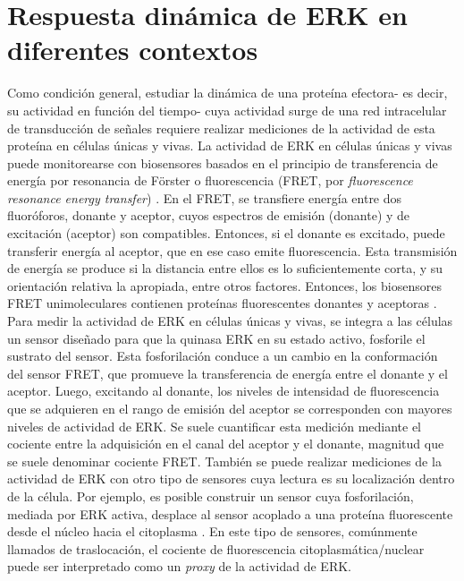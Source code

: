 \documentclass[./main.tex]{subfiles}
\begin{document}
\section{Respuesta dinámica de ERK en diferentes contextos}
\label{C1_sec:ERK}

Como condición general, estudiar la dinámica de una proteína efectora- es decir, su actividad en función del tiempo- cuya actividad surge de una red intracelular de transducción de señales requiere realizar mediciones de la actividad de esta proteína en células únicas y vivas. La actividad de ERK en células únicas y vivas puede monitorearse con biosensores basados en el principio de transferencia de energía por resonancia de Förster o fluorescencia (FRET, por \textit{fluorescence resonance energy transfer}) \cite{Komatsu2011}. En el FRET, se transfiere energía entre dos fluoróforos, donante y aceptor, cuyos espectros de emisión (donante) y de excitación (aceptor) son compatibles. Entonces, si el donante es excitado, puede transferir energía al aceptor, que en ese caso emite fluorescencia. Esta transmisión de energía se produce si la distancia entre ellos es lo suficientemente corta, y su orientación relativa la apropiada, entre otros factores. Entonces, los biosensores FRET unimoleculares contienen proteínas fluorescentes donantes y aceptoras  \cite{JaresErijman2003,Miyawaki2003}. Para medir la actividad de ERK en células únicas y vivas, se integra a las células un sensor diseñado para que la quinasa ERK en su estado activo, fosforile el sustrato del sensor. Esta fosforilación conduce a un cambio en la conformación del sensor FRET, que promueve la transferencia de energía entre el donante y el aceptor. Luego, excitando al donante, los niveles de intensidad de fluorescencia que se adquieren en el rango de emisión del aceptor se corresponden con mayores niveles de actividad de ERK. Se suele cuantificar esta medición mediante el cociente entre la adquisición en el canal del aceptor y el donante, magnitud que se suele denominar cociente FRET. También se puede realizar mediciones de la actividad de ERK con otro tipo de sensores cuya lectura es su localización dentro de la célula. Por ejemplo, es posible construir un sensor cuya fosforilación, mediada por ERK activa, desplace al sensor acoplado a una proteína fluorescente desde el núcleo hacia el citoplasma \cite{Regot2014}. En este tipo de sensores, comúnmente llamados de traslocación, el cociente de fluorescencia citoplasmática/nuclear puede ser interpretado como un \textit{proxy} de la actividad de ERK.
\end{document}
